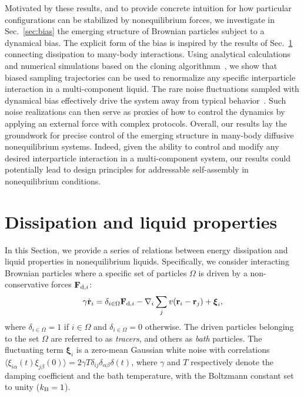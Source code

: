 \documentclass[superscriptaddress, twocolumn, prx, longbibliography, nofootinbib]{revtex4-1}
\begin{document}
Motivated by these results, and to provide concrete intuition for how particular configurations can be stabilized by nonequilibrium forces, we investigate in Sec.~\ref{sec:bias} the emerging structure of Brownian particles subject to a dynamical bias. The explicit form of the bias is inspired by the results of Sec.~\ref{sec:method} connecting dissipation to many-body interactions. Using analytical calculations and numerical simulations based on the cloning algorithmm~\cite{Giadina2006, tailleur2007probing, Hurtado2009, Nemoto2016, Ray2018, Klymko2018, Brewer2018}, we show that biased sampling trajectories can be used to renormalize any specific interparticle interaction in a multi-component liquid. The rare noise fluctuations sampled with dynamical bias effectively drive the system away from typical behavior~\cite{garrahan2007, Hedges2009, Jack2010, Pitard2011, Speck2012, Bodineau2012a, Chetrite2013, Limmer2014, Nemoto2017}. Such noise realizations can then serve as proxies of how to control the dynamics by applying an external force with complex protocols. Overall, our results lay the groundwork for precise control of the emerging structure in many-body diffusive nonequilibrium systems. Indeed, {given the ability to control and modify any desired interparticle interaction in a multi-component system}, our results could potentially lead to design principles for addressable self-assembly in
nonequilibrium conditions.




\section{Dissipation and liquid properties}\label{sec:method}

In this Section, we provide a series of relations between energy dissipation and liquid properties in nonequilibrium liquids. Specifically, we consider interacting Brownian particles where a specific set of particles $\Omega$ is driven by a non-conservative forces ${\bf F}_{{\rm d},i}$:
\begin{equation}\label{eq:dyn}
	\gamma\dot{\bf r}_i = \delta_{i\in\Omega}{\bf F}_{{\rm d},i} - \nabla_i \sum_j v({\bf r}_i-{\bf r}_j) + {\boldsymbol\xi}_i ,
\end{equation}
where $\delta_{i\in\Omega}=1$ if $i\in\Omega$ and $\delta_{i\in\Omega}=0$ otherwise. The driven particles belonging to the set $\Omega$ are referred to as {\it tracers}, and others as {\it bath} particles. The fluctuating term ${\boldsymbol\xi}_i$ is a zero-mean Gaussian white noise with correlations $\langle\xi_{i\alpha}(t)\xi_{j\beta}(0)\rangle=2\gamma T\delta_{ij}\delta_{\alpha\beta}\delta(t)$, where $\gamma$ and $T$ respectively denote the damping coefficient and the bath temperature, with the Boltzmann constant set to unity ($k_{\rm B}=1$). 
\end{document}

